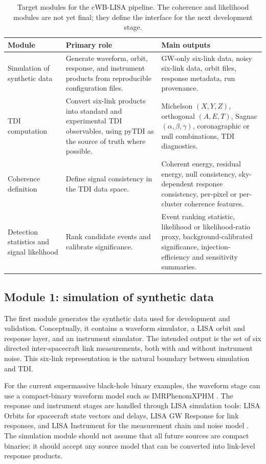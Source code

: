\documentclass[%
 reprint,
 amsmath,amssymb,
 aps,
 prd,
]{revtex4-2}
\begin{document}
\begin{table}
\caption{Target modules for the cWB-LISA pipeline.  The coherence and likelihood modules are not yet final; they define the interface for the next development stage.}
\label{tab:modules}
\begin{ruledtabular}
\begin{tabular}{p{}p{}p{}}
Module & Primary role & Main outputs \\
\hline
Simulation of synthetic data & Generate waveform, orbit, response, and instrument products from reproducible configuration files. & GW-only six-link data, noisy six-link data, orbit files, response metadata, run provenance. \\
TDI computation & Convert six-link products into standard and experimental TDI observables, using pyTDI as the source of truth where possible. & Michelson $(X,Y,Z)$, orthogonal $(A,E,T)$, Sagnac $(\alpha,\beta,\gamma)$, coronagraphic or null combinations, TDI diagnostics. \\
Coherence definition & Define signal consistency in the TDI data space. & Coherent energy, residual energy, null consistency, sky-dependent response consistency, per-pixel or per-cluster coherence features. \\
Detection statistics and signal likelihood & Rank candidate events and calibrate significance. & Event ranking statistic, likelihood or likelihood-ratio proxy, background-calibrated significance, injection-efficiency and sensitivity summaries. \\
\end{tabular}
\end{ruledtabular}
\end{table}

\subsection{Module 1: simulation of synthetic data}
\label{subsec:simulation}

The first module generates the synthetic data used for development and validation.  Conceptually, it contains a waveform simulator, a LISA orbit and response layer, and an instrument simulator.  The intended output is the set of six directed inter-spacecraft link measurements, both with and without instrument noise.  This six-link representation is the natural boundary between simulation and TDI.

For the current supermassive black-hole binary examples, the waveform stage can use a compact-binary waveform model such as IMRPhenomXPHM \cite{Pratten2021IMRPhenomXPHM}.  The response and instrument stages are handled through LISA simulation tools: LISA Orbits for spacecraft state vectors and delays, LISA GW Response for link responses, and LISA Instrument for the measurement chain and noise model \cite{LISAOrbits,LISAGWResponse,LISAInstrument,Bayle2023Instrument}.  The simulation module should not assume that all future sources are compact binaries; it should accept any source model that can be converted into link-level response products.
\end{document}
